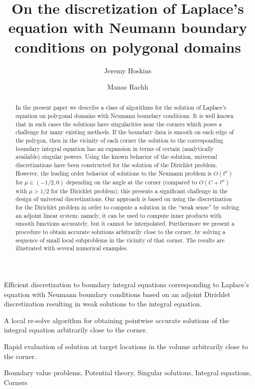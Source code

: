\documentclass[12pt]{elsarticle}
\begin{document}
\begin{frontmatter}

 \title{On the discretization of Laplace's equation with Neumann boundary conditions on polygonal domains}
\author[jh]{Jeremy Hoskins}
\author[mr]{Manas Rachh}
\address[jh]{Applied Mathematics Program, Yale University, USA. \\ email: jeremy.hoskins@yale.edu}
\address[mr]{Center for Computational Mathematics, Flatiron Institute, USA. \\ email: mrachh@flatironinstitute.org}
 
\begin{abstract}
In the present paper we describe a class of algorithms for the solution of Laplace's equation on polygonal domains with Neumann boundary conditions. It is well known that in such cases the solutions have singularities near the corners which poses a challenge for many existing methods. 
If the boundary data is smooth on each edge of the polygon, then in the vicinity of each corner the solution to the corresponding boundary integral equation has an expansion in terms of certain (analytically available) singular powers. Using the known behavior of the solution, universal discretizations have been constructed for the solution of the Dirichlet problem. 
However, the leading order behavior of solutions to the Neumann problem is $O(t^{\mu})$ for $\mu \in (-1/2,0)$ depending on the angle at the corner (compared to $O(C+t^{\mu})$ with $\mu>1/2$ for the Dirichlet problem); this presents a significant challenge in the design of universal discretizations. Our approach is based on using the discretization for the Dirichlet problem in order to compute a solution in the ``weak sense'' by solving an adjoint linear system; namely, it can be used to compute inner products with smooth functions accurately, but it cannot be interpolated.  Furthermore we present a procedure to obtain accurate solutions arbitrarily close to the corner, by solving a sequence of small local subproblems in the vicinity of that corner. The results are illustrated with several numerical examples.
\end{abstract}


\begin{highlights}
\item Efficient discretization to boundary integral equations corresponding to Laplace's equation with Neumann boundary conditions based on an adjoint Dirichlet discretization resulting
in weak solutions to the integral equation. 
\item A local re-solve algorithm for obtaining pointwise accurate solutions of the integral equation arbitrarily close to the corner.
\item Rapid evaluation of solution at target locations in the volume arbitrarily close to the corner.
\end{highlights}


\begin{keyword}
Boundary value problems, Potential theory, Singular solutions, Integral equations, Corners
\end{keyword}

\end{frontmatter}
\end{document}
